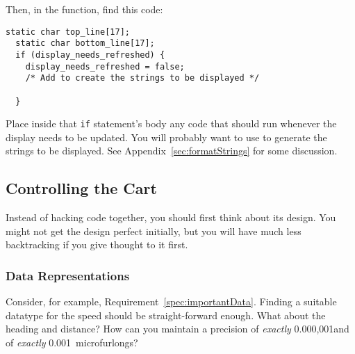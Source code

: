 Then, in the  function, find this code:
\begin{lstlisting}[basicstyle=\small]
  static char top_line[17];
  static char bottom_line[17];
  if (display_needs_refreshed) {
    display_needs_refreshed = false;
    /* Add to create the strings to be displayed */

  }
\end{lstlisting}

Place inside that \lstinline{if} statement's body any code that should run whenever the display needs to be updated.
You will probably want to use  to generate the strings to be displayed.
See Appendix~\ref{sec:formatStrings} for some discussion.

\subsection{Controlling the Cart}

Instead of hacking code together, you should first think about its design.
You might not get the design perfect initially, but you will have much less backtracking if you give thought to it first.

\subsubsection{Data Representations}

Consider, for example, Requirement~\ref{spec:importantData}.
Finding a suitable datatype for the speed should be straight-forward enough.
What about the heading and distance?
How can you maintain a precision of \textit{exactly} 0.000,001\textdegree and of \textit{exactly} 0.001~microfurlongs?

